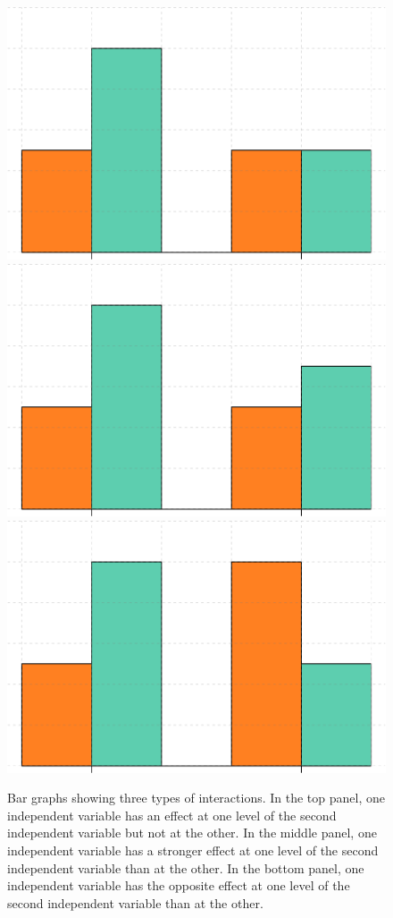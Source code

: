 \documentclass[
]{krantz}
\begin{document}
\begin{figure}

{\centering \includegraphics[width=0.51\linewidth]{08-complex-designs_files/figure-latex/barinteractions-1} \includegraphics[width=0.51\linewidth]{08-complex-designs_files/figure-latex/barinteractions-2} \includegraphics[width=0.51\linewidth]{08-complex-designs_files/figure-latex/barinteractions-3} 

}

\caption{Bar graphs showing three types of interactions. In the top panel, one independent variable has an effect at one level of the second independent variable but not at the other. In the middle panel, one independent variable has a stronger effect at one level of the second independent variable than at the other. In the bottom panel, one independent variable has the opposite effect at one level of the second independent variable than at the other.}\label{fig:barinteractions}
\end{figure}
\end{document}
